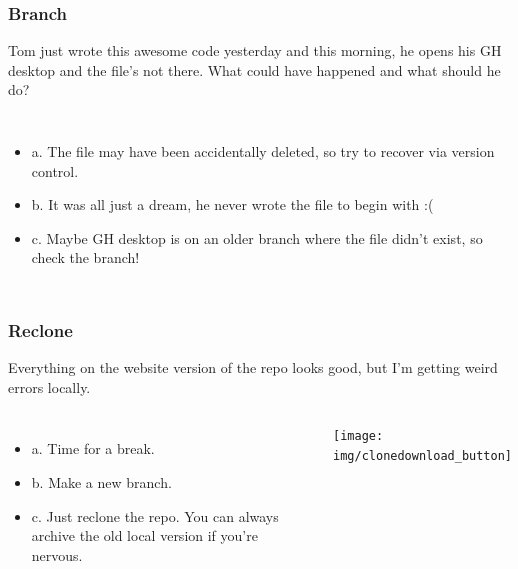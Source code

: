 \documentclass[aspectratio=169]{beamer} %
\begin{document}
\begin{frame}
\frametitle{Branch}
Tom just wrote this awesome code yesterday and this morning, he opens his GH desktop and the file's
not there. What could have happened and what should he do?
\begin{columns}[c]
	\begin{itemize}
		\item a. The file may have been accidentally deleted, so try to recover via version control.
		\item b. It was all just a dream, he never wrote the file to begin with :(
		\item c. Maybe GH desktop is on an older branch where the file didn't exist, so check the branch!
	\end{itemize}

\end{columns}





\end{frame}

\begin{frame}
\frametitle{Reclone}

	Everything on the website version of the repo looks good, but I'm getting weird errors locally.
	\begin{columns}[c]
			\begin{itemize}
				\item a. Time for a break.
				\item b. Make a new branch.
				\item c. Just reclone the repo. You can always archive the old local version if you're nervous.
			\end{itemize}

		\texttt{[image: img/clonedownload\_button]}

	\end{columns}


\end{frame}
\end{document}
